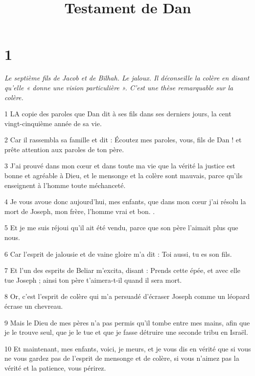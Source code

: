 

\title{Testament de Dan}

\chapter{1}

\par \textit{Le septième fils de Jacob et de Bilhah. Le jaloux. Il déconseille la colère en disant qu'elle « donne une vision particulière ». C'est une thèse remarquable sur la colère.}

\par 1 LA copie des paroles que Dan dit à ses fils dans ses derniers jours, la cent vingt-cinquième année de sa vie.

\par 2 Car il rassembla sa famille et dit : Écoutez mes paroles, vous, fils de Dan ! et prête attention aux paroles de ton père.

\par 3 J'ai prouvé dans mon cœur et dans toute ma vie que la vérité la justice est bonne et agréable à Dieu, et le mensonge et la colère sont mauvais, parce qu'ils enseignent à l'homme toute méchanceté.

\par 4 Je vous avoue donc aujourd'hui, mes enfants, que dans mon cœur j'ai résolu la mort de Joseph, mon frère, l'homme vrai et bon. .

\par 5 Et je me suis réjoui qu'il ait été vendu, parce que son père l'aimait plus que nous.

\par 6 Car l'esprit de jalousie et de vaine gloire m'a dit : Toi aussi, tu es son fils.

\par 7 Et l'un des esprits de Beliar m'excita, disant : Prends cette épée, et avec elle tue Joseph ; ainsi ton père t'aimera-t-il quand il sera mort.

\par 8 Or, c'est l'esprit de colère qui m'a persuadé d'écraser Joseph comme un léopard écrase un chevreau.

\par 9 Mais le Dieu de mes pères n'a pas permis qu'il tombe entre mes mains, afin que je le trouve seul, que je le tue et que je fasse détruire une seconde tribu en Israël.

\par 10 Et maintenant, mes enfants, voici, je meurs, et je vous dis en vérité que si vous ne vous gardez pas de l'esprit de mensonge et de colère, si vous n'aimez pas la vérité et la patience, vous périrez.

